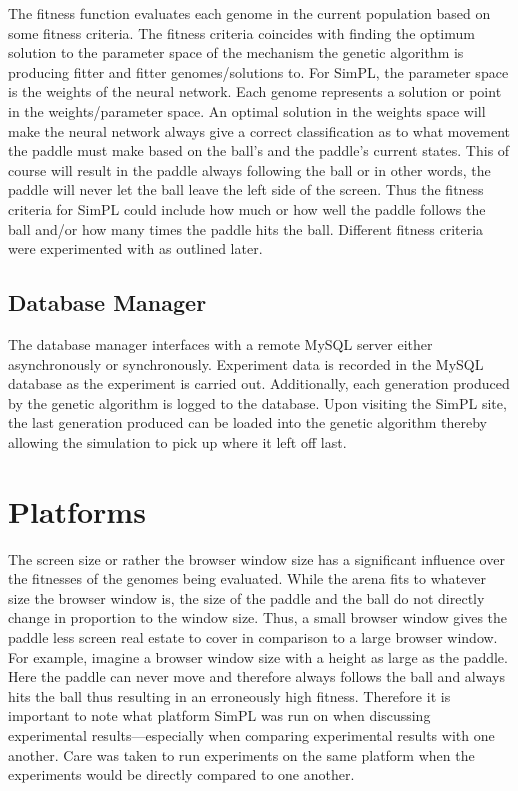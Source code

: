 \documentclass[a4paper,10pt]{article}
\begin{document}
The fitness function evaluates each genome in the current population based on some fitness criteria. The fitness criteria coincides with finding the optimum solution to the parameter space of the mechanism the genetic algorithm is producing fitter and fitter genomes/solutions to. For SimPL, the parameter space is the weights of the neural network. Each genome represents a solution or point in the weights/parameter space. An optimal solution in the weights space will make the neural network always give a correct classification as to what movement the paddle must make based on the ball's and the paddle's current states. This of course will result in the paddle always following the ball or in other words, the paddle will never let the ball leave the left side of the screen. Thus the fitness criteria for SimPL could include how much or how well the paddle follows the ball and/or how many times the paddle hits the ball. Different fitness criteria were experimented with as outlined later. 


\subsection{Database Manager}

The database manager interfaces with a remote MySQL server either asynchronously or synchronously. Experiment data is recorded in the MySQL database as the experiment is carried out. Additionally, each generation produced by the genetic algorithm is logged to the database. Upon visiting the SimPL site, the last generation produced can be loaded into the genetic algorithm thereby allowing the simulation to pick up where it left off last.  

\section{Platforms}

The screen size or rather the browser window size has a significant influence over the fitnesses of the genomes being evaluated. While the arena fits to whatever size the browser window is, the size of the paddle and the ball do not directly change in proportion to the window size. Thus, a small browser window gives the paddle less screen real estate to cover in comparison to a large browser window. For example, imagine a browser window size with a height as large as the paddle. Here the paddle can never move and therefore always follows the ball and always hits the ball thus resulting in an erroneously high fitness. Therefore it is important to note what platform SimPL was run on when discussing experimental results---especially when comparing experimental results with one another. Care was taken to run experiments on the same platform when the experiments would be directly compared to one another. 
\end{document}
